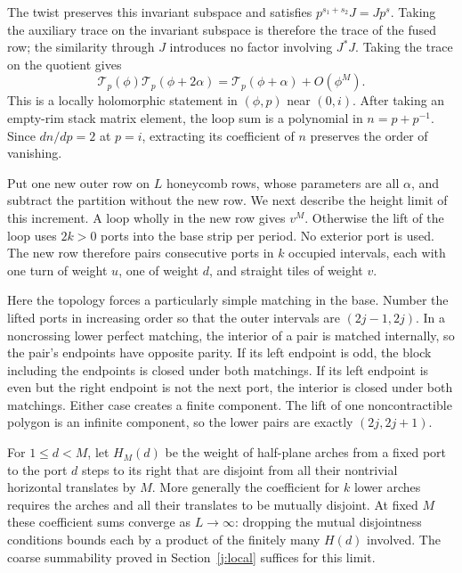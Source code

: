 The twist preserves this invariant subspace and satisfies
$p^{s_1+s_2}J=Jp^s$. Taking the auxiliary trace on the invariant subspace
is therefore the trace of the fused row; the similarity through $J$
introduces no factor involving $J^*J$. Taking the trace on the quotient
gives
\begin{equation}\label{j:boundary-row-fusion}
 \mathcal T_p(\phi)\mathcal T_p(\phi+2\alpha)
 =\mathcal T_p(\phi+\alpha)+O(\phi^M).
\end{equation}
This is a locally holomorphic statement in $(\phi,p)$ near $(0,i)$.
After taking an empty-rim stack matrix element, the loop sum is a
polynomial in $n=p+p^{-1}$. Since $dn/dp=2$ at $p=i$, extracting its
coefficient of $n$ preserves the order of vanishing.

Put one new outer row on $L$ honeycomb rows, whose parameters are all
$\alpha$, and subtract the partition without the new row. We next describe
the height limit of this increment. A loop wholly in the new row gives
$v^M$. Otherwise the lift of the loop uses $2k>0$ ports into the base strip
per period. No exterior port is used. The new row therefore pairs
consecutive ports in $k$ occupied intervals, each with one turn of weight
$u$, one of weight $d$, and straight tiles of weight $v$.

Here the topology forces a particularly simple matching in the base.
Number the lifted ports in increasing order so that the outer intervals
are $(2j-1,2j)$. In a noncrossing lower perfect matching, the interior of
a pair is matched internally, so the pair's endpoints have opposite
parity. If its left endpoint is odd, the block including the endpoints is
closed under both matchings. If its left endpoint is even but the right
endpoint is not the next port, the interior is closed under both
matchings. Either case creates a finite component. The lift of one
noncontractible polygon is an infinite component, so the lower pairs are
exactly $(2j,2j+1)$.

For $1\le d<M$, let $H_M(d)$ be the weight of half-plane arches from a
fixed port to the port $d$ steps to its right that are disjoint from all
their nontrivial horizontal translates by $M$. More generally the
coefficient for $k$ lower arches requires the arches and all their
translates to be mutually disjoint. At fixed $M$ these coefficient sums
converge as $L\to\infty$: dropping the mutual disjointness conditions
bounds each by a product of the finitely many $H(d)$ involved. The coarse
summability proved in Section~\ref{j:local} suffices for this limit.

